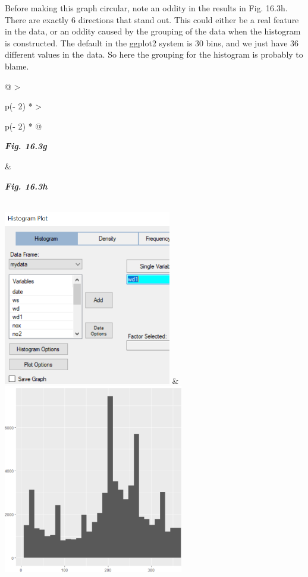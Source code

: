 \documentclass[
  letterpaper,
  DIV=11,
  numbers=noendperiod]{scrreprt}
\begin{document}
Before making this graph circular, note an oddity in the results in Fig.
16.3h. There are exactly 6 directions that stand out. This could either
be a real feature in the data, or an oddity caused by the grouping of
the data when the histogram is constructed. The default in the ggplot2
system is 30 bins, and we just have 36 different values in the data. So
here the grouping for the histogram is probably to blame.

\begin{longtable}[]{@{}
  >{\raggedright\arraybackslash}p{(\columnwidth - 2\tabcolsep) * }
  >{\raggedright\arraybackslash}p{(\columnwidth - 2\tabcolsep) * }@{}}
\toprule\noalign{}
\begin{minipage}[b]{\linewidth}\raggedright
\textbf{\emph{Fig. 16.3g}}
\end{minipage} & \begin{minipage}[b]{\linewidth}\raggedright
\textbf{\emph{Fig. 16.3h}}
\end{minipage} \\
\midrule\noalign{}
\endhead
\bottomrule\noalign{}
\endlastfoot
\includegraphics[width=2.88257in,height=3.01017in]{figures/Fig16.3g.png}
&
\includegraphics[width=3.09602in,height=3.25797in]{figures/Fig16.3h.png} \\
\end{longtable}
\end{document}
